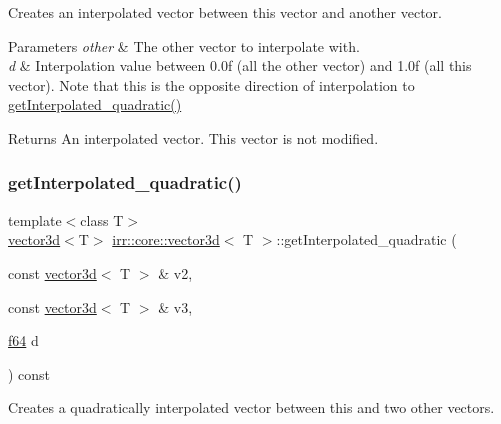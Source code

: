 Creates an interpolated vector between this vector and another vector. 


\begin{DoxyParams}{Parameters}
{\em other} & The other vector to interpolate with. \\
\hline
{\em d} & Interpolation value between 0.\+0f (all the other vector) and 1.\+0f (all this vector). Note that this is the opposite direction of interpolation to \hyperlink{classirr_1_1core_1_1vector3d_aacaa4bbf35d509b1264d1e8e2d48360e}{get\+Interpolated\+\_\+quadratic()} \\
\hline
\end{DoxyParams}
\begin{DoxyReturn}{Returns}
An interpolated vector. This vector is not modified. 
\end{DoxyReturn}
\mbox{\label{classirr_1_1core_1_1vector3d_aacaa4bbf35d509b1264d1e8e2d48360e}} 
\subsubsection{\texorpdfstring{get\+Interpolated\+\_\+quadratic()}{getInterpolated\_quadratic()}\hspace{0.1cm}{\footnotesize\ttfamily [1/2]}}
{\footnotesize\ttfamily template$<$class T$>$ \\
\hyperlink{classirr_1_1core_1_1vector3d}{vector3d}$<$T$>$ \hyperlink{classirr_1_1core_1_1vector3d}{irr\+::core\+::vector3d}$<$ T $>$\+::get\+Interpolated\+\_\+quadratic (\begin{DoxyParamCaption}\item[{const \hyperlink{classirr_1_1core_1_1vector3d}{vector3d}$<$ T $>$ \&}]{v2,  }\item[{const \hyperlink{classirr_1_1core_1_1vector3d}{vector3d}$<$ T $>$ \&}]{v3,  }\item[{\hyperlink{namespaceirr_a1325b02603ad449f92c68fc640af9b28}{f64}}]{d }\end{DoxyParamCaption}) const\hspace{0.3cm}{\ttfamily [inline]}}



Creates a quadratically interpolated vector between this and two other vectors. 


